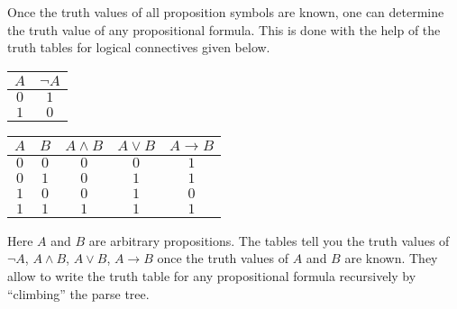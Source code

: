 

\setcounter{section}{1}
\setcounter{subsection}{2}
\setcounter{dfn}{2}


Once the truth values of all proposition symbols are known, one can determine the truth value of any propositional formula.
This is done with the help of the truth tables for logical connectives given below.

\begin{center}
\begin{tabular}{|c||c|}
\hline
$A$ & $\neg A$\\\hline
$0$ & $1$\\\hline
$1$ & $0$\\\hline
\end{tabular}
\hspace{2cm}
\begin{tabular}{|c|c||c|c|c|}
\hline
$A$ & $B$ & $A \wedge B$ & $A \vee B$ & $A \to B$\\\hline
$0$ & $0$ & $0$ & $0$ & $1$\\\hline
$0$ & $1$ & $0$ & $1$ & $1$\\\hline
$1$ & $0$ & $0$ & $1$ & $0$\\\hline
$1$ & $1$ & $1$ & $1$ & $1$\\\hline
\end{tabular}
\end{center}

Here $A$ and $B$ are arbitrary propositions.
The tables tell you the truth values of $\neg A$, $A \wedge B$, $A \vee B$, $A \to B$ once the truth values of $A$ and $B$ are known.
They allow to write the truth table for any propositional formula recursively by ``climbing'' the parse tree.



